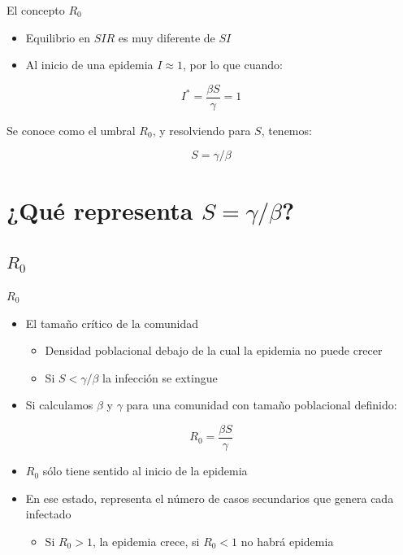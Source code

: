 \documentclass[
  11pt,
  ignorenonframetext,
]{beamer}
\providecommand{\tightlist}{%
  \setlength{\itemsep}{0pt}\setlength{\parskip}{0pt}}
\begin{document}
\begin{frame}{El concepto \(R_0\)}
\begin{itemize}
\item
  Equilibrio en \(SIR\) es muy diferente de \(SI\)
\item
  Al inicio de una epidemia \(I \approx 1\), por lo que cuando:
\end{itemize}

\[I^* = \frac{\beta S}{\gamma} = 1\]

Se conoce como el umbral \(R_0\), y resolviendo para \(S\), tenemos:

\[S = \gamma/\beta\]
\end{frame}

\hypertarget{quuxe9-representa-s-gammabeta}{%
\section{\texorpdfstring{¿Qué representa
\(S = \gamma/\beta\)?}{¿Qué representa S = \textbackslash gamma/\textbackslash beta?}}\label{quuxe9-representa-s-gammabeta}}

\hypertarget{r_0}{%
\subsection{\texorpdfstring{\(R_0\)}{R\_0}}\label{r_0}}

\begin{frame}{\(R_0\)}
\begin{itemize}
\item
  El tamaño crítico de la comunidad

  \begin{itemize}
  \item
    Densidad poblacional debajo de la cual la epidemia no puede crecer
  \item
    Si \(S < \gamma / \beta\) la infección se extingue
  \end{itemize}
\item
  Si calculamos \(\beta\) y \(\gamma\) para una comunidad con tamaño
  poblacional definido:
\end{itemize}

\[R_0 = \frac{\beta S}{\gamma}\]

\begin{itemize}
\item
  \(R_0\) sólo tiene sentido al inicio de la epidemia
\item
  En ese estado, representa el número de casos secundarios que genera
  cada infectado

  \begin{itemize}
  \tightlist
  \item
    Si \(R_0 > 1\), la epidemia crece, si \(R_0 < 1\) no habrá epidemia
  \end{itemize}
\end{itemize}
\end{frame}
\end{document}
